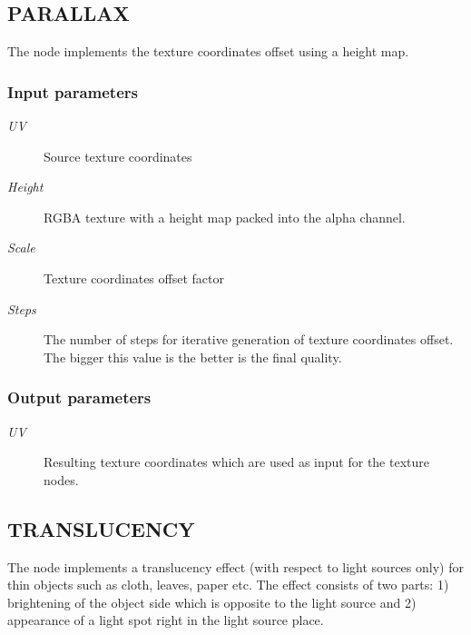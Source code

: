 \documentclass[a4paper,12pt,oneside]{sphinxmanual}
\begin{document}
\subsection{PARALLAX}
\label{node_materials:parallax}
The node implements the texture coordinates offset using a height map.


\subsubsection{Input parameters}
\label{node_materials:id4}\begin{description}
\item[{\emph{UV}}] \leavevmode
Source texture coordinates

\item[{\emph{Height}}] \leavevmode
RGBA texture with a height map packed into the alpha channel.

\item[{\emph{Scale}}] \leavevmode
Texture coordinates offset factor

\item[{\emph{Steps}}] \leavevmode
The number of steps for iterative generation of texture coordinates offset. The bigger this value is the better is the final quality.

\end{description}


\subsubsection{Output parameters}
\label{node_materials:id5}\begin{description}
\item[{\emph{UV}}] \leavevmode
Resulting texture coordinates which are used as input for the texture nodes.

\end{description}


\subsection{TRANSLUCENCY}
\label{node_materials:translucency}
The node implements a translucency effect (with respect to light sources only) for thin objects such as cloth, leaves, paper etc. The effect consists of two parts: 1) brightening of the object side which is opposite to the light source and 2) appearance of a light spot right in the light source place.
\end{document}
